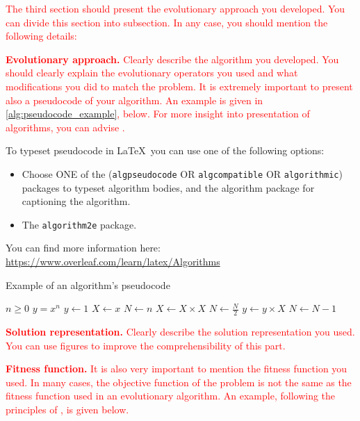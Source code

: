 \documentclass{scrartcl}
\begin{document}
\textcolor{red}{The third section should present the evolutionary approach you developed. You can divide this section into subsection. In any case, you should mention the following details:}

\textcolor{red}{\textbf{Evolutionary approach.} Clearly describe the algorithm you developed. You should clearly explain the evolutionary operators you used and what modifications you did to match the problem. It is extremely important to present also a pseudocode of your algorithm. An example is given in \ref{alg:pseudocode_example}, below. For more insight into presentation of algorithms, you can advise \cite{zobel2014algorithms}.}

{
\color{red}To typeset pseudocode in \LaTeX\ you can use one of the following options:
\begin{itemize}
    \item Choose ONE of the (\texttt{algpseudocode} OR \texttt{algcompatible} OR \texttt{algorithmic}) packages to typeset algorithm bodies, and the algorithm package for captioning the algorithm.
    \item The \texttt{algorithm2e} package.
\end{itemize}
You can find more information here: \url{https://www.overleaf.com/learn/latex/Algorithms}
}

\begin{algorithm}
\caption{Example of an algorithm's pseudocode}\label{alg:pseudocode_example}
\begin{algorithmic}
\Require $n \geq 0$
\Ensure $y = x^n$
\State $y \gets 1$
\State $X \gets x$
\State $N \gets n$
    \State $X \gets X \times X$
    \State $N \gets \frac{N}{2}$  
    \State $y \gets y \times X$
    \State $N \gets N - 1$
\EndIf
\EndWhile
\end{algorithmic}
\end{algorithm}

\textcolor{red}{\textbf{Solution representation.} Clearly describe the solution representation you used. You can use figures to improve the comprehensibility of this part.}

\textcolor{red}{\textbf{Fitness function.} It is also very important to mention the fitness function you used. In many cases, the objective function of the problem is not the same as the fitness function used in an evolutionary algorithm. An example, following the principles of \cite{zobel2014mathematics}, is given below.}
\end{document}
